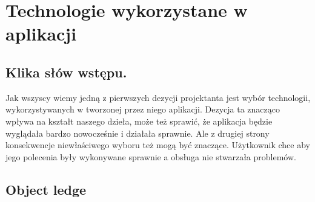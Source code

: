 

\section{Technologie wykorzystane w aplikacji}
\subsection{Klika słów wstępu.}
Jak wszyscy wiemy jedną z pierwszych dezycji projektanta jest wybór technologii, 
wykorzystywanych w tworzonej przez niego aplikacji. Dezycja ta znacząco wpływa na kształt naszego dzieła,
może też sprawić, że aplikacja będzie wyglądała bardzo nowocześnie i działała sprawnie. Ale z drugiej strony 
konsekwencje niewłaściwego wyboru też mogą być znaczące. Użytkownik chce aby jego polecenia były wykonywane
sprawnie a obsługa nie stwarzała problemów.
\subsection{Object ledge}